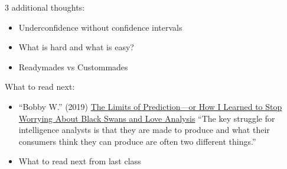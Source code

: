 \documentclass[aspectratio=169]{beamer}
\begin{document}
{
\begin{frame}[plain]

\vspace{3.58in}
\hspace{-0.32in}
\end{frame}
}
\begin{frame}

3 additional thoughts:
\begin{itemize}
\item Underconfidence without confidence intervals
\item What is hard and what is easy?
\item Readymades vs Custommades
\end{itemize}

\end{frame}
\begin{frame}

What to read next:
\begin{itemize}
\item ``Bobby W.'' (2019) \href{https://www.cia.gov/library/center-for-the-study-of-intelligence/csi-publications/csi-studies/studies/vol-63-no-4/Limits-of-Prediction.html}{The Limits of Prediction---or How I Learned to Stop Worrying About Black Swans and Love Analysis} ``The key struggle for intelligence analysts is that they are made to produce and what their consumers think they can produce are often two different things.''
\item What to read next from last class
\end{itemize}

\end{frame}
\frame{\titlepage}
\end{document}
